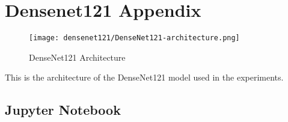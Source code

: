 \section{Densenet121 Appendix}\label{s:densenet121_appendix}

\begin{figure}[H]
  \begin{center}
    \texttt{[image: densenet121/DenseNet121-architecture.png]}
  \end{center}
  \caption{DenseNet121 Architecture}\label{f:densenet121_arch}
\end{figure}

This is the architecture of the DenseNet121 model used in the experiments.

\subsection{Jupyter Notebook}

